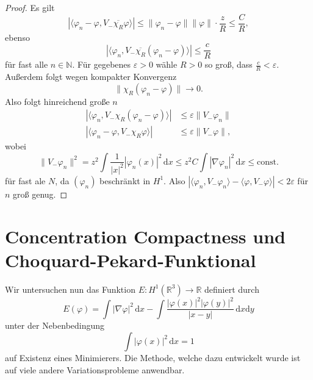 \documentclass[
paper=a4,
bibtotocnumbered,
liststotocnumbered,
tablecaptionabove,
pointlessnumbers,
twoside,
openright,
10pt
]
{report}
\let\phi\varphi
\theoremstyle{definition}
\numberwithin{equation}{chapter}
\begin{document}
\begin{proof}
Es gilt
\begin{equation}
|\langle \phi_n - \phi, V_- \overline{\chi_R} \phi\rangle| \le \| \phi_n - \phi\| \| \phi\| \cdot \frac{z}{R} \le \frac{C}{R},
\end{equation}
ebenso
\begin{equation}
|\langle \phi_n, V_- \overline{\chi_R}(\phi_n - \phi)\rangle | \le \frac{c}{R}
\end{equation}
für fast alle $n\in \mathbb N$. Für gegebenes $\varepsilon>0$ wähle $R>0$ so groß, dass $\frac{c}{R} <\varepsilon$. Außerdem folgt wegen kompakter Konvergenz
\begin{equation}
\| \chi_R(\phi_n - \phi)\| \to 0.
\end{equation}
Also folgt hinreichend große $n$%
\begin{align*}
|\langle \phi_n, V_- \chi_R(\phi_n- \phi)\rangle | &\le \varepsilon \| V_- \phi_n\|\\
|\langle \phi_n - \phi, V_- \chi_R \phi\rangle |&\le \varepsilon \| V_- \phi\|,
\end{align*}
wobei $$\| V_- \phi_n\|^2 = z^2 \int \frac{1}{|x|^2} |\phi_n(x)|^2\, \mathrm dx \le z^2 C\int |\nabla \phi_n|^2\, \mathrm dx \le \text{const}.$$
für fast ale $N$, da $(\phi_n)$ beschränkt in $H^1$. Also $|\langle \phi_n, V_- \phi_n\rangle - \langle \phi, V_-\phi\rangle|< 2\varepsilon$ für  $n$ groß genug.
\end{proof}

\section{Concentration Compactness und Choquard-Pekard-Funktional}
Wir untersuchen nun das Funktion $E: H^1(\mathbb R^3) \to \mathbb R$ definiert durch
\begin{equation}
E(\phi) = \int |\nabla \phi|^2\, \mathrm dx - \int \frac{|\phi(x)|^2 |\phi(y)|^2}{|x-y|} \, \mathrm dx \mathrm dy
\end{equation}
unter der Nebenbedingung 
\begin{equation}
\int |\phi(x)|^2\, \mathrm dx =1
\end{equation}
auf Existenz eines Minimierers. Die Methode, welche dazu entwickelt wurde ist auf viele andere Variationsprobleme anwendbar.
\end{document}
